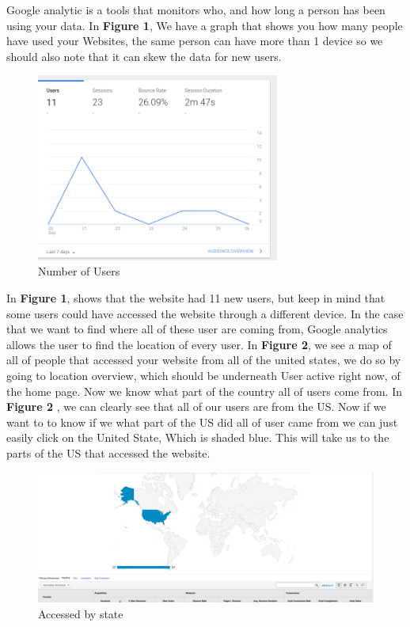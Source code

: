\documentclass{article}
\begin{document}
Google analytic is a tools that monitors who, and how long a person has been using your data. In \textbf{Figure 1}, We have a graph that shows you how many people have used your Websites,  the same person can have more than 1 device so we should also note that it can skew the data for new users.
\begin{figure}[t]
\includegraphics[width=8cm]{users}
\centering
\caption{Number of Users}
\end{figure}
In \textbf{Figure 1}, shows that the website had 11 new users, but keep in mind that some users could have accessed the website through a different device. In the case that we want to find where all of these user are coming from, Google analytics allows the user to find the location of every user. In \textbf{Figure 2}, we see a map of all of people that accessed your website from all of the united states, we do so by going to location overview, which should be underneath User active right now, of the home page. Now we know what part of the country all of users come from. In \textbf{Figure 2 }, we can clearly see that all of our users are from the US. Now if we want to to know if we what part of the US did all of user came from we can just easily click on the United State, Which is shaded blue. This will take us to the parts of the US that accessed the website.
\begin{figure}[t]
\includegraphics[scale = .5]{places.png}
\centering
\caption{Accessed by state }
\end{figure}
\end{document}
